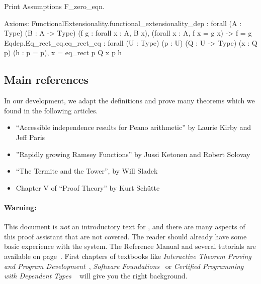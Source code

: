 \documentclass[a4paper]{book}
\begin{document}
\begin{Coqsrc}
Print Assumptions F_zero_eqn. 
\end{Coqsrc}

\begin{Coqanswer}
Axioms:
FunctionalExtensionality.functional_extensionality_dep
  : forall (A : Type) (B : A -> Type) (f g : forall x : A, B x),
    (forall x : A, f x = g x) -> f = g
Eqdep.Eq_rect_eq.eq_rect_eq
  : forall (U : Type) (p : U) (Q : U -> Type) (x : Q p) (h : p = p),
    x = eq_rect p Q x p h
\end{Coqanswer}



\subsection{Main references}

In our development, we adapt the definitions and prove many theorems which
we found in the following articles. 
\begin{itemize}
\item ``Accessible independence results for Peano arithmetic''  by Laurie Kirby and Jeff Paris~\cite{KP82}
\item ''Rapidly growing Ramsey Functions'' by Jussi Ketonen and Robert Solovay~\cite{KS81}
\item ``The Termite and the Tower'', by Will Sladek~\cite{Sladek07thetermite}
\item Chapter V of ``Proof Theory'' by Kurt Schütte~\cite{schutte}
\end{itemize}







\paragraph*{Warning:}

This document is \emph{not} an introductory text for \coq{}, and there are many aspects of this proof assistant that are not covered. 
 The reader should already have some basic experience with the \coq{} system. The Reference Manual and several tutorials are available on \coq{} page~\cite{Coq}.  First chapters of textbooks like \emph{Interactive Theorem Proving and Program Development}~\cite{BC04}, \emph{Software Foundations}~\cite{SF} or  \emph{Certified Programming with Dependent Types} ~\cite{chlipalacpdt2011} will give you the right background. 
\end{document}
